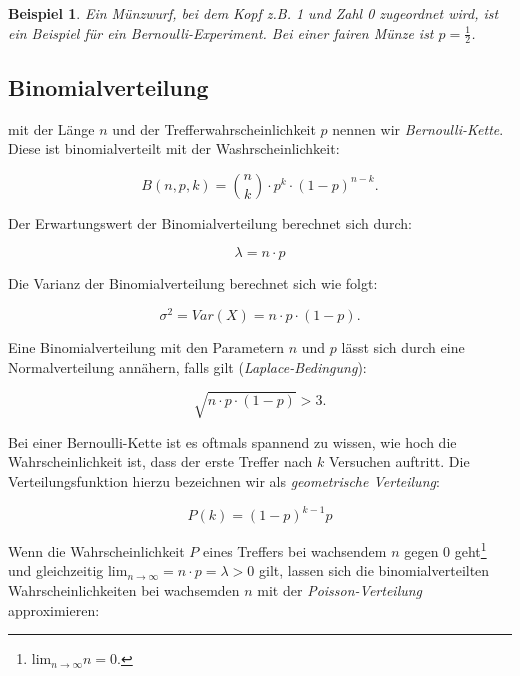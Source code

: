 \documentclass{tufte-handout}
\theoremstyle{own}
\newtheorem{example}{Beispiel}[]
\begin{document}
\begin{example}
	Ein Münzwurf, bei dem Kopf z.B. 1 und Zahl 0 zugeordnet wird, ist
	ein Beispiel für ein Bernoulli-Experiment. Bei einer fairen Münze ist 
	$p= \frac{1}{2}$.
\end{example}

\subsection{Binomialverteilung}

 mit der Länge $n$ und der Trefferwahrscheinlichkeit
$p$ nennen wir \emph{Bernoulli-Kette}. Diese ist binomialverteilt mit der 
Washrscheinlichkeit:

\begin{equation}
	B(n,p,k) = \binom{n}{k} \cdot p^k \cdot (1-p)^{n-k}.
\end{equation}

Der Erwartungswert der Binomialverteilung berechnet sich durch:

\begin{equation}
	\lambda = n \cdot p
\end{equation}

Die Varianz der Binomialverteilung berechnet sich wie folgt:

\begin{equation}
	\sigma^2 = Var(X) = n \cdot p \cdot (1-p).
\end{equation}

Eine Binomialverteilung mit den Parametern $n$ und $p$ lässt sich durch eine Normalverteilung annähern,
falls gilt (\emph{Laplace-Bedingung}): 

\begin{equation}
\sqrt{n \cdot p \cdot (1-p)} > 3.
\end{equation}

Bei einer Bernoulli-Kette ist es oftmals spannend zu wissen, wie hoch die
Wahrscheinlichkeit ist, dass der erste Treffer nach $k$ Versuchen auftritt.
Die Verteilungsfunktion hierzu bezeichnen wir als \emph{geometrische Verteilung}:

\begin{equation}
	P(k) = (1 - p)^{k-1} p
\end{equation}

Wenn die Wahrscheinlichkeit $P$ eines Treffers bei wachsendem $n$ gegen 0
geht\footnote{$\text{lim}_{n \rightarrow \infty} n = 0$.} und gleichzeitig
$\text{lim}_{n \rightarrow \infty} = n \cdot p = \lambda > 0$ gilt, lassen
sich die binomialverteilten Wahrscheinlichkeiten bei wachsemden $n$ mit der
\emph{Poisson-Verteilung} approximieren:
\end{document}
